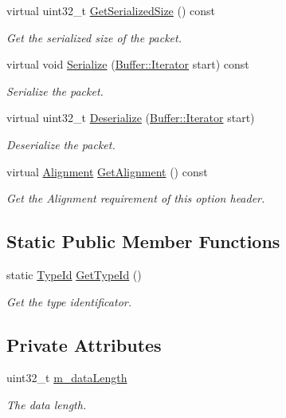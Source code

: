 \begin{DoxyCompactItemize}
virtual uint32\+\_\+t \hyperlink{classns3_1_1Ipv6OptionJumbogramHeader_a88df7b9773d392a7ce3ed515deb9a405}{Get\+Serialized\+Size} () const 
\begin{DoxyCompactList}\small\item\em Get the serialized size of the packet. \end{DoxyCompactList}\item 
virtual void \hyperlink{classns3_1_1Ipv6OptionJumbogramHeader_a7bdf0a525d3397f8250d4468a221f0c9}{Serialize} (\hyperlink{classns3_1_1Buffer_1_1Iterator}{Buffer\+::\+Iterator} start) const 
\begin{DoxyCompactList}\small\item\em Serialize the packet. \end{DoxyCompactList}\item 
virtual uint32\+\_\+t \hyperlink{classns3_1_1Ipv6OptionJumbogramHeader_abbd293011adcb442cf53eaf61aa401c6}{Deserialize} (\hyperlink{classns3_1_1Buffer_1_1Iterator}{Buffer\+::\+Iterator} start)
\begin{DoxyCompactList}\small\item\em Deserialize the packet. \end{DoxyCompactList}\item 
virtual \hyperlink{structns3_1_1Ipv6OptionHeader_1_1Alignment}{Alignment} \hyperlink{classns3_1_1Ipv6OptionJumbogramHeader_a6030fcbcdcf0f990cb5458227ee83c8b}{Get\+Alignment} () const 
\begin{DoxyCompactList}\small\item\em Get the Alignment requirement of this option header. \end{DoxyCompactList}\end{DoxyCompactItemize}
\subsection*{Static Public Member Functions}
\begin{DoxyCompactItemize}
\item 
static \hyperlink{classns3_1_1TypeId}{Type\+Id} \hyperlink{classns3_1_1Ipv6OptionJumbogramHeader_a0c268ffc5eab33847a450494996c4779}{Get\+Type\+Id} ()
\begin{DoxyCompactList}\small\item\em Get the type identificator. \end{DoxyCompactList}\end{DoxyCompactItemize}
\subsection*{Private Attributes}
\begin{DoxyCompactItemize}
\item 
uint32\+\_\+t \hyperlink{classns3_1_1Ipv6OptionJumbogramHeader_ab9f077892b290a311493d02f8e14cf86}{m\+\_\+data\+Length}
\begin{DoxyCompactList}\small\item\em The data length. \end{DoxyCompactList}\end{DoxyCompactItemize}

